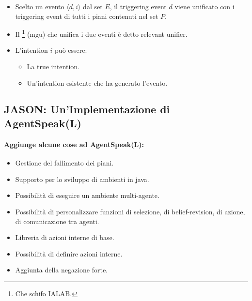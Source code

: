 \begin{itemize}
  \item Scelto un evento $\langle d, i \rangle$ dal set $E$, il triggering event $d$ viene unificato con i triggering event di tutti i piani contenuti nel set $P$. 
  \item Il \footnote{Che schifo IALAB.} (mgu) che unifica i due eventi è detto relevant unifier. 
  \item L'intention $i$ può essere:
    \begin{itemize}
      \item La true intention. 
      \item Un'intention esistente che ha generato l'evento.
    \end{itemize}
\end{itemize}


\subsection{JASON: Un'Implementazione di AgentSpeak(L)}


\paragraph{Aggiunge alcune cose ad AgentSpeak(L):}

\begin{itemize}
  \item Gestione del fallimento dei piani. 
    \item Supporto per lo sviluppo di ambienti in java. 
    \item Possibilità di eseguire un ambiente multi-agente. 
    \item Possibilità di personalizzare funzioni di selezione, di belief-revision, di azione, di comunicazione tra agenti. 
    \item Libreria di azioni interne di base. 
    \item Possibilità di definire azioni interne. 
    \item Aggiunta della negazione forte.
\end{itemize}

